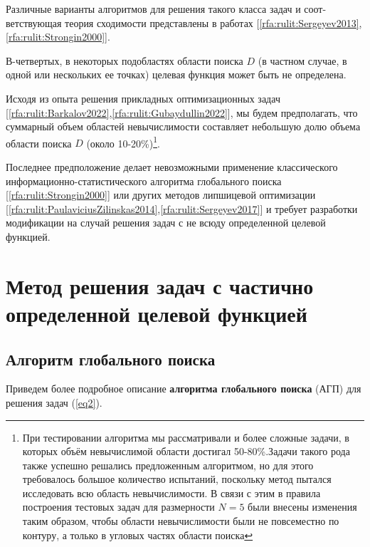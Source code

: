 \documentclass[10pt,a4paper]{book}
\begin{document}
Различные варианты алгоритмов для решения такого класса задач и соот-ветствующая теория сходимости представлены в работах [\ref{rfa:rulit:Sergeyev2013},\ref{rfa:rulit:Strongin2000}].

В-четвертых, в некоторых подобластях области поиска $D$ (в частном случае, в одной или нескольких ее точках) целевая функция может быть не определена.

Исходя из опыта решения прикладных оптимизационных задач [\ref{rfa:rulit:Barkalov2022},\ref{rfa:rulit:Gubaydullin2022}], мы будем предполагать, что суммарный объем областей невычислимости составляет небольшую долю объема области поиска $D$ (около 10-20\%)\footnote{При тестировании алгоритма мы рассматривали и более сложные задачи, в которых объём невычислимой области достигал 50-80\%.Задачи такого рода также успешно решались предложенным алгоритмом, но для этого требовалось большое количество испытаний, поскольку метод пытался исследовать всю область невычислимости. В связи с этим в правила построения тестовых задач для размерности $N=5$ были внесены изменения таким образом, чтобы области невычислимости были не повсеместно по контуру, а только в угловых частях области поиска}.

Последнее предположение делает невозможными применение классического информационно-ста\-тис\-ти\-чес\-ко\-го алгоритма глобального поиска  [\ref{rfa:rulit:Strongin2000}] или других методов липшицевой оптимизации [\ref{rfa:rulit:PaulaviciusZilinskas2014},\ref{rfa:rulit:Sergeyev2017}] и требует разработки модификации на случай решения задач с не всюду определенной целевой функцией.

\section{Метод решения задач с частично определенной целевой функцией}

\subsection{Алгоритм глобального поиска}

Приведем более подробное описание \textbf{алгоритма глобального поиска} (АГП) для решения задач (\ref{eq2}).
\end{document}
